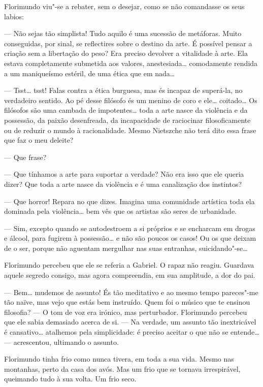 Florimundo viu"-se a rebater, sem o desejar, como se não comandasse os
seus labios:

--- Não sejas tão simplista! Tudo aquilo é uma sucessão de metáforas.
Muito conseguidas, por sinal, se reflectires sobre o destino da arte. É
possível pensar a criação sem a libertação do peso? Era preciso devolver
a vitalidade à arte. Ela estava completamente submetida aos valores,
anestesiada\ldots{} comodamente rendida a um maniqueísmo estéril, de uma
ética que em nada\ldots{}

--- Tsst\ldots{} tsst! Falas contra a ética burguesa, mas és incapaz de
superá-la, no verdadeiro sentido. Ao pé desse filósofo és um menino de
coro e ele\ldots{} coitado\ldots{} Os filósofos são uma cambada de
impotentes\ldots{} toda a arte nasce da violência e da possessão, da paixão
desenfreada, da incapacidade de raciocinar filosoficamente ou de reduzir
o mundo à racionalidade. Mesmo Nietszche não terá dito essa frase que
faz o meu deleite?

--- Que frase?

--- Que tínhamos a arte para suportar a verdade? Não era isso que ele
queria dizer? Que toda a arte nasce da violência e é uma canalização dos
instintos?

--- Que horror! Repara no que dizes. Imagina uma comunidade artística toda
ela dominada pela violência\ldots{} bem vês que os artistas são seres de
urbanidade.

--- Sim, excepto quando se autodestroem a si próprios e se encharcam em
drogas e álcool, para fugirem à possessão\ldots{} e não são poucos os casos!
Ou os que deixam de o ser, porque não aguentam mergulhar nas suas
entranhas, suicidando"-se\ldots{}

Florimundo percebeu que ele se referia a Gabriel. O rapaz não reagiu.
Guardava aquele segredo consigo, mas agora compreendia, em sua
amplitude, a dor do pai.

--- Bem\ldots{} mudemos de assunto! És tão meditativo e ao mesmo tempo
pareces"-me tão naïve, mas vejo que estás bem instruído. Quem foi o
músico que te ensinou filosofia? --- O tom de voz era irónico, mas
perturbador. Florimundo percebeu que ele sabia demasiado acerca de si. ---
Na verdade, um assunto tão inextricável é cansativo\ldots{} atalhemos pela
simplicidade: é preciso aceitar o que não se entende\ldots{} --- acrescentou,
ultimando o assunto.

Florimundo tinha frio como nunca tivera, em toda a sua vida. Mesmo nas
montanhas, perto da casa dos avós. Mas um frio que se tornava
irrespirável, queimando tudo à sua volta. Um frio seco.

